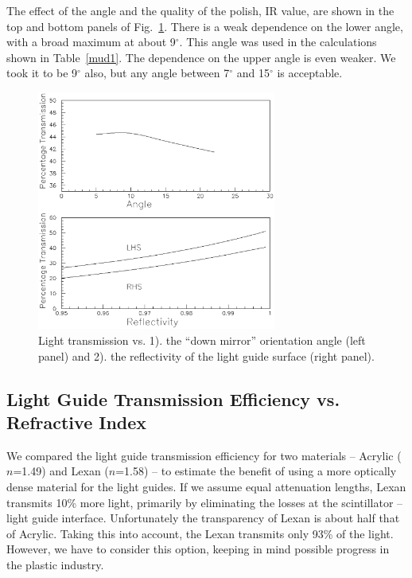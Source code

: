 The effect of the angle and the quality of the polish, IR value, are shown in 
the top and bottom panels of Fig.~\ref{trans1}.  There is a weak dependence on 
the lower angle, with a broad maximum at about 9$^\circ$.  This angle was used 
in the calculations shown in Table~\ref{mud1}.  The dependence on the upper 
angle is even weaker.  We took it to be 9$^\circ$ also, but any angle between 
7$^\circ$ and 15$^\circ$ is acceptable. 

\begin{figure}[htbp]
\centering
\includegraphics[width=0.7\textwidth]{trans.ps}
\caption{\small{Light transmission vs. 1). the ``down mirror'' orientation 
angle (left panel) and 2). the reflectivity of the light guide surface (right 
panel).}}
\label{trans1}
\end{figure}

\subsection{Light Guide Transmission Efficiency vs. Refractive Index}
\label{mu5}

We compared the light guide transmission efficiency for two materials -- 
Acrylic ($n$=1.49) and Lexan ($n$=1.58) -- to estimate the benefit of using
a more optically dense material for the light guides.  If we assume equal 
attenuation lengths, Lexan transmits 10\% more light, primarily by 
eliminating the losses at the scintillator -- light guide interface. 
Unfortunately the transparency of Lexan is about half that of Acrylic.
Taking this into account, the Lexan transmits only 93\% of the light. 
However, we have to consider this option, keeping in mind possible  
progress in the plastic industry.

